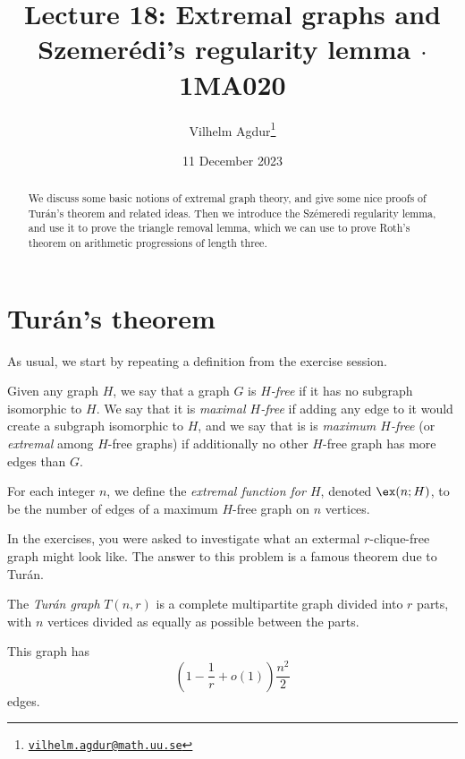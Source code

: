 \documentclass[nobib]{tufte-handout}
\title{Lecture 18: Extremal graphs and Szemerédi's regularity lemma $\cdot$ 1MA020}
\author[Vilhelm Agdur]{Vilhelm Agdur\thanks{\href{mailto:vilhelm.agdur@math.uu.se}{\nolinkurl{vilhelm.agdur@math.uu.se}}}}
\date{11 December 2023}
\begin{document}
\maketitle%

\begin{abstract}
\noindent
We discuss some basic notions of extremal graph theory, and give some nice proofs of Turán's theorem and related ideas. Then we introduce the Szémeredi regularity lemma, and use it to prove the triangle removal lemma, which we can use to prove Roth's theorem on arithmetic progressions of length three.
\end{abstract}

\section{Turán's theorem}

As usual, we start by repeating a definition from the exercise session.

\begin{definition}
    Given any graph $H$, we say that a graph $G$ is \emph{$H$-free} if it has no subgraph isomorphic to $H$. We say that it is \emph{maximal $H$-free} if adding any edge to it would create a subgraph isomorphic to $H$, and we say that is is \emph{maximum $H$-free} (or \emph{extremal} among $H$-free graphs) if additionally no other $H$-free graph has more edges than $G$.
  
    For each integer $n$, we define the \emph{extremal function for $H$}, denoted $\ex(n; H)$, to be the number of edges of a maximum $H$-free graph on $n$ vertices.
\end{definition}

In the exercises, you were asked to investigate what an extermal $r$-clique-free graph might look like. The answer to this problem is a famous theorem due to Turán.

\begin{definition}
    The \emph{Turán graph} $T(n,r)$ is a complete multipartite graph divided into $r$ parts, with $n$ vertices divided as equally as possible between the parts.

    This graph has
    $$\left(1 - \frac{1}{r} + o(1)\right)\frac{n^2}{2}$$
    edges.
\end{definition}
\end{document}
